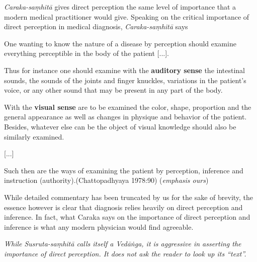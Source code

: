 {{\sl Caraka-saṃhitā}\relax} gives direct perception the same level of importance that a modern medical practitioner would give. Speaking on the critical importance of direct perception in medical diagnosis, {\sl Caraka-saṃhitā} says 
\begin{myquote}
One wanting to know the nature of a disease by perception should examine everything perceptible in the body of the patient [...].

Thus for instance one should examine with the {\bf auditory sense} the intestinal sounds, the sounds of the joints and finger knuckles, variations in the patient's voice, or any other sound that may be present in any part of the body.  

With the {\bf visual sense} are to be examined the color, shape, proportion and the general appearance as well as changes in physique and behavior of the patient.  Besides, whatever else can be the object of visual knowledge should also be similarly examined.

[...]

Such then are the ways of examining the patient by perception, inference and instruction (authority).\hfill (Chattopadhyaya 1978:90) ({\sl emphasis ours})
\end{myquote}

While detailed commentary has been truncated by us for the sake of brevity, the essence however is clear that diagnosis relies heavily on direct perception and inference.  In fact, what Caraka says on the importance of direct perception and inference is what any modern physician would find agreeable.

{{\sl While Susruta-saṃhitā calls itself a Vedāṅga, it is aggressive in asserting the importance of direct perception. It does not ask the reader to look up its ``text''.}}

